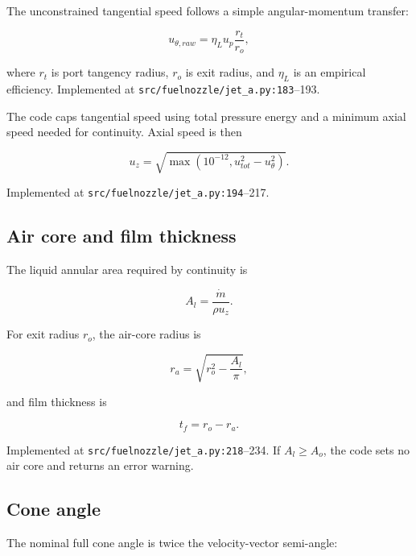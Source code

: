 \documentclass[11pt]{article}
\newcommand{\srcline}[2]{\nolinkurl{#1:#2}}
\begin{document}
The unconstrained tangential speed follows a simple angular-momentum transfer:

\begin{equation}
  u_{\theta,raw}=\eta_L u_p\frac{r_t}{r_o},
  \label{eq:angular-momentum-closure}
\end{equation}

where $r_t$ is port tangency radius, $r_o$ is exit radius, and $\eta_L$ is an
empirical efficiency. Implemented at \srcline{src/fuelnozzle/jet_a.py}{183}--193.

The code caps tangential speed using total pressure energy and a minimum axial speed
needed for continuity. Axial speed is then

\begin{equation}
  u_z=\sqrt{\max\left(10^{-12},u_{tot}^2-u_\theta^2\right)}.
  \label{eq:axial-velocity}
\end{equation}

Implemented at \srcline{src/fuelnozzle/jet_a.py}{194}--217.

\subsection{Air core and film thickness}

The liquid annular area required by continuity is

\begin{equation}
  A_l=\frac{\dot m}{\rho u_z}.
  \label{eq:liquid-annulus-area}
\end{equation}

For exit radius $r_o$, the air-core radius is

\begin{equation}
  r_a=\sqrt{r_o^2-\frac{A_l}{\pi}},
  \label{eq:air-core-radius}
\end{equation}

and film thickness is

\begin{equation}
  t_f=r_o-r_a.
  \label{eq:film-thickness}
\end{equation}

Implemented at \srcline{src/fuelnozzle/jet_a.py}{218}--234. If $A_l\geq A_o$,
the code sets no air core and returns an error warning.

\subsection{Cone angle}

The nominal full cone angle is twice the velocity-vector semi-angle:
\end{document}
